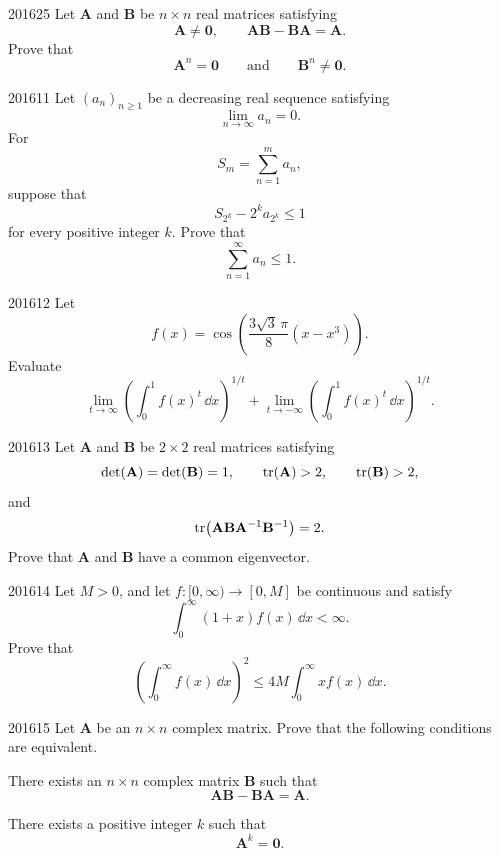 \begin{problem}{2016}{2}{5}
Let $\mathbf A$ and $\mathbf B$ be $n\times n$ real matrices satisfying
\[
    \mathbf A\ne\mathbf0,
    \qquad
    \mathbf A\mathbf B-\mathbf B\mathbf A=\mathbf A.
\]
Prove that
\[
    \mathbf A^n=\mathbf0
    \qquad\text{and}\qquad
    \mathbf B^n\ne\mathbf0.
\]
\end{problem}

\begin{problem}{2016}{1}{1}
Let $(a_n)_{n\ge1}$ be a decreasing real sequence satisfying
\[
    \lim_{n\to\infty}a_n=0.
\]
For
\[
    S_m=\sum_{n=1}^m a_n,
\]
suppose that
\[
    S_{2^k}-2^k a_{2^k}\le1
\]
for every positive integer $k$. Prove that
\[
    \sum_{n=1}^{\infty}a_n\le1.
\]
\end{problem}

\begin{problem}{2016}{1}{2}
Let
\[
    f(x)=\cos\left(\frac{3\sqrt3\, \pi}{8}(x-x^3)\right).
\]
Evaluate
\[
    \lim_{t\to\infty}
    \left(\int_0^1f(x)^t\, \dd x\right)^{1/t}
    +
    \lim_{t\to-\infty}
    \left(\int_0^1f(x)^t\, \dd x\right)^{1/t}.
\]
\end{problem}

\begin{problem}{2016}{1}{3}
Let $\mathbf A$ and $\mathbf B$ be $2\times2$ real matrices satisfying
\[
    \det(\mathbf A)=\det(\mathbf B)=1,
    \qquad
    \operatorname{tr}(\mathbf A)>2,
    \qquad
    \operatorname{tr}(\mathbf B)>2,
\]
and
\[
    \operatorname{tr}\!\left(\mathbf A\mathbf B\mathbf A^{-1}\mathbf B^{-1}\right)=2.
\]
Prove that $\mathbf A$ and $\mathbf B$ have a common eigenvector.
\end{problem}

\begin{problem}{2016}{1}{4}
Let $M>0$, and let $f\colon[0, \infty)\to[0, M]$ be continuous and satisfy
\[
    \int_0^{\infty}(1+x)f(x)\, \dd x<\infty.
\]
Prove that
\[
    \left(\int_0^{\infty}f(x)\, \dd x\right)^2
    \le
    4M\int_0^{\infty}xf(x)\, \dd x.
\]
\end{problem}

\begin{problem}{2016}{1}{5}
Let $\mathbf A$ be an $n\times n$ complex matrix. Prove that the following conditions are equivalent.
\begin{problemclauses}
    \item There exists an $n\times n$ complex matrix $\mathbf B$ such that
    \[
        \mathbf A\mathbf B-\mathbf B\mathbf A=\mathbf A.
    \]
    \item There exists a positive integer $k$ such that
    \[
        \mathbf A^k=\mathbf0.
    \]
\end{problemclauses}
\end{problem}
